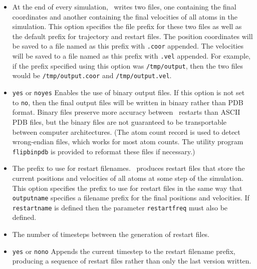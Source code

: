 \begin{itemize}
\item
{}
{\label{param:outputname}
At the end of every simulation, \NAMD\ writes two files, one 
containing the final coordinates and another containing 
the final velocities of all atoms in the simulation.  
This option specifies the file prefix for these two files as
well as the default prefix for trajectory and restart files.  
The position coordinates will be saved to a file named as this prefix 
with {\tt .coor} appended.  
The velocities will be saved to a file 
named as this prefix with {\tt .vel} appended.  
For example, 
if the prefix specified using this option was {\tt /tmp/output}, 
then the two files 
would be {\tt /tmp/output.coor} and {\tt /tmp/output.vel}.}

\item
{}
{{\tt yes} or {\tt no}}{{\tt yes}}
{
Enables the use of binary output files.  
If this option is not set to {\tt no}, then the final output files 
will be written in binary rather than PDB format.  
Binary files preserve more accuracy between \NAMD\ restarts 
than ASCII PDB files, 
but the binary files are not guaranteed to be transportable 
between computer architectures. (The atom count record is used
to detect wrong-endian files, which works for most atom counts.
The utility program {\tt flipbinpdb} is provided
to reformat these files if necessary.)
}

\item
{}
{
The prefix to use for restart filenames.  
\NAMD\ produces restart files 
that store the current positions and velocities of all 
atoms at some step of the simulation.  
This option specifies the prefix to use for restart 
files in the same way that {\tt outputname} 
specifies a filename prefix for the final
positions and velocities.  
If {\tt restartname} is defined then
the parameter {\tt restartfreq} must also be defined.}

\item
{}
{
The number of timesteps between the generation of restart files.  
}

\item
{}
{{\tt yes} or {\tt no}}{{\tt no}}
{
Appends the current timestep to the restart filename prefix, producing
a sequence of restart files rather than only the last version written.
}


\end{itemize}
